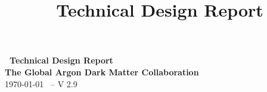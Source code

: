 \documentclass[aps,superscriptaddress,floatfix,nofootinbib,showpacs,amsmath,amssymb,altaffilletter,floatfix,11pt]{revtex4-1}
\begin{document}
\setlength{\parindent}{1em}
\setdefaultleftmargin{1em}{1em}{}{}{}{}
\setcounter{page}{0}\thispagestyle{empty}
\onecolumngrid
\begin{center}
{\bf \LARGE \DSk\ Technical Design Report}\\
\vspace{.5in}
{\bf \Large The Global Argon Dark Matter Collaboration}\\
\vspace{.5in}
\today
{\large\ -- V 2.9}
\end{center}
\vspace{.2in}
%
\clearpage
\newpage
{}
\title{\DSk\ Technical Design Report}

\maketitle
\clearpage
\onecolumngrid
\setcounter{tocdepth}{2}
\tableofcontents
\makeatletter
\let\toc@pre\relax
\let\toc@post\relax
\makeatother
\clearpage
\listoffigures
\clearpage
\listoftables
\clearpage
\newpage
{}
\clearpage
\onecolumngrid
\newpage
{}
\clearpage


%
  

  
  
  



 



%







\end{document}
